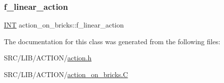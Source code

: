 \mbox{\label{classaction__on__bricks_a88b884b19c838a2650a40331c949657b}} 
\subsubsection{\texorpdfstring{f\+\_\+linear\+\_\+action}{f\_linear\_action}}
{\footnotesize\ttfamily \mbox{\hyperlink{galois_8h_a09fddde158a3a20bd2dcadb609de11dc}{I\+NT}} action\+\_\+on\+\_\+bricks\+::f\+\_\+linear\+\_\+action}



The documentation for this class was generated from the following files\+:\begin{DoxyCompactItemize}
\item 
S\+R\+C/\+L\+I\+B/\+A\+C\+T\+I\+O\+N/\mbox{\hyperlink{action_8h}{action.\+h}}\item 
S\+R\+C/\+L\+I\+B/\+A\+C\+T\+I\+O\+N/\mbox{\hyperlink{action__on__bricks_8_c}{action\+\_\+on\+\_\+bricks.\+C}}\end{DoxyCompactItemize}
